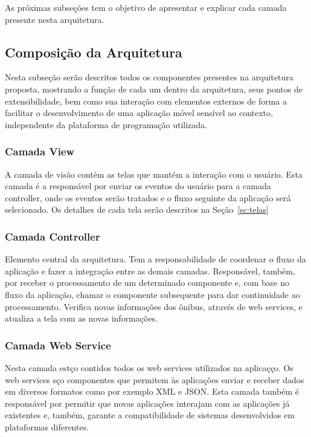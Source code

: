 As próximas subseções tem o objetivo de apresentar e explicar cada camada presente nesta arquitetura.  


\subsection{Composição da Arquitetura}
Nesta subse\c{c}\~{a}o ser\~{a}o descritos todos os componentes presentes na arquitetura proposta, mostrando a fun\c{c}\~{a}o de cada um dentro da arquitetura, seus pontos de extensibilidade, bem como sua intera\c{c}\~{a}o com elementos externos de forma a facilitar o desenvolvimento de uma aplica\c{c}\~{a}o m\'{o}vel sens\'{i}vel ao contexto, independente da plataforma de programa\c{c}\~{a}o utilizada.

\subsubsection{Camada View}
A camada de vis\~{a}o cont\'{e}m as telas que mant\'{e}m a intera\c{c}\~{a}o com o usu\'{a}rio. Esta camada \'{e} a respons\'{a}vel por enviar os eventos do usu\'{a}rio para a camada controller, onde os eventos ser\~{a}o tratados e o fluxo seguinte da aplica\c{c}\~{a}o ser\'{a} selecionado. Os detalhes de cada tela ser\~{a}o descritos na Se\c{c}\~{a}o~\ref{sc:telas}

\subsubsection{Camada Controller}
Elemento central da arquitetura. Tem a responsabilidade de coordenar o fluxo da aplica\c{c}\~{a}o e fazer a integra\c{c}\~{a}o entre as demais camadas. Respons\'{a}vel, tamb\'{e}m, por receber o processamento de um determinado componente e, com base no fluxo da aplica\c{c}\~{a}o, chamar o componente subsequente para dar continuidade ao processamento. Verifica novas informa\c{c}\~{o}es dos \^{o}nibus, atrav\'{e}s de web services, e atualiza a tela com as novas informa\c{c}\~{o}es.

\subsubsection{Camada Web Service}
Nesta camada est\c{c}o contidos todos os web services utilizados na aplica\c{c}\c{c}o. Os web services s\c{c}o componentes que permitem \`{a}s aplica\c{c}\~{o}es enviar e receber dados em diversos formatos como por exemplo XML e JSON. Esta camada tamb\'{e}m \'{e} respons\'{a}vel por permitir que novas aplica\c{c}\~{o}es interajam com as aplica\c{c}\~{o}es j\'{a} existentes e, tamb\'{e}m, garante a compatibilidade de sistemas desenvolvidos em plataformas diferentes.

